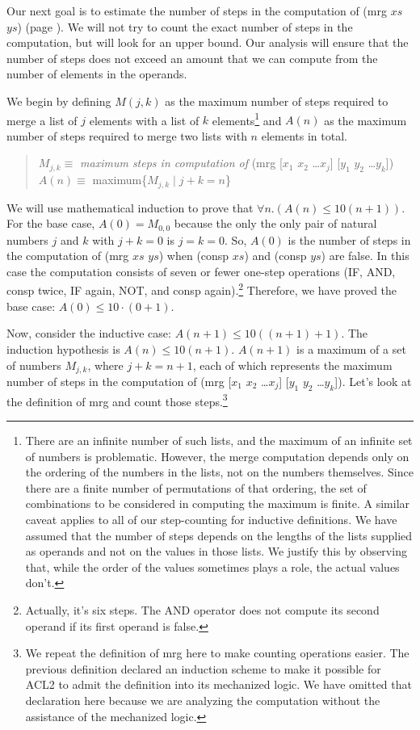 Our next goal is to estimate the number of steps in
the computation of (mrg $xs$ $ys$) (page \pageref{defun:mrg}).
We will not try to count the exact number of steps in the computation,
but will look for an upper bound.
Our analysis will ensure that the number of steps does not exceed an
amount that we can compute from the number of elements in the operands.

We begin by defining $M(j,k)$ as the maximum number of steps required to merge a list
of $j$ elements with a list of $k$ elements\footnote{There are an infinite number
of such lists, and the maximum
of an infinite set of numbers is problematic. However, the merge computation
depends only on the ordering of the numbers in the lists, not on the numbers themselves.
Since there are a finite number of permutations of that ordering, the set of
combinations to be considered in computing the maximum is finite.
A similar caveat applies to all of our step-counting for inductive definitions.
We have assumed that the number of steps depends on the lengths of the lists
supplied as operands and not on the values in those lists.
We justify this by observing that, while the order of the values sometimes
plays a role, the actual values don't.}
and $A(n)$ as the maximum number of steps required to merge two lists
with $n$ elements in total.
\begin{quote}
$M_{j,k} \equiv$ \emph{maximum steps in computation of} (mrg [$x_1$ $x_2$ \dots $x_j$] [$y_1$ $y_2$ \dots $y_k$]) \\
$A(n) \equiv$ maximum\{$M_{j,k} \mid j + k = n$\}
\end{quote}

We will use mathematical induction to prove that $\forall n.(A(n) \leq 10(n+1))$.
For the base case, $A(0) = M_{0,0}$ because the only the only pair of natural
numbers $j$ and $k$ with $j + k = 0$ is $j = k = 0$.
So, $A(0)$ is the number of steps in the computation of (mrg $xs$ $ys$)
when (consp $xs$) and (consp $ys$) are false.
In this case the computation consists of seven or fewer one-step operations
(IF, AND, consp twice, IF again, NOT, and consp again).\footnote{Actually,
it's six steps. The AND operator does not compute its second operand
if its first operand is false.}
Therefore, we have proved the base case: $A(0) \leq 10\cdot(0 + 1)$.

Now, consider the inductive case: $A(n+1) \leq 10((n+1) + 1)$.
The induction hypothesis is $A(n) \leq 10(n + 1)$.
$A(n+1)$ is a maximum of a set of numbers $M_{j,k}$, where $j + k = n+1$,
each of which represents the maximum number of steps in the computation of
(mrg [$x_1$ $x_2$ \dots $x_j$] [$y_1$ $y_2$ \dots $y_k$]).
Let's look at the definition of mrg and count those steps.\footnote{We
repeat the definition of mrg here to make counting operations easier.
The previous definition declared an induction scheme to make it
possible for ACL2 to admit the definition into its mechanized logic.
We have omitted that declaration here because we are analyzing
the computation without the assistance of the mechanized logic.}

